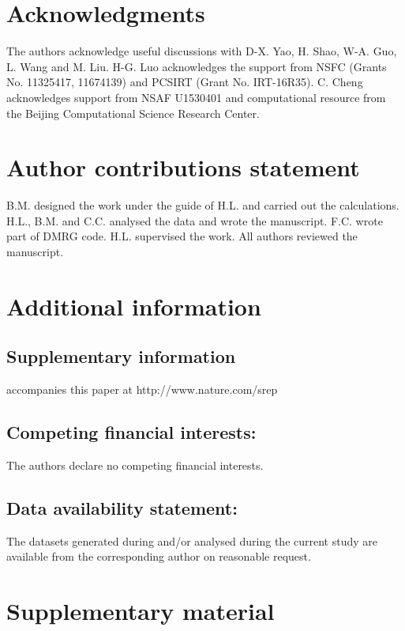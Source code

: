 \documentclass[article,10pt,onecolumn,superscriptaddress,floatfix]{revtex4}
\begin{document}
\section*{Acknowledgments}

The authors acknowledge useful discussions with D-X. Yao, H. Shao, W-A. Guo, L. Wang and M. Liu.
H-G. Luo acknowledges the support from NSFC (Grants No. 11325417, 11674139) and PCSIRT (Grant No. IRT-16R35).
C. Cheng acknowledges support from NSAF U1530401 and computational resource from the Beijing Computational Science Research Center.

\section*{Author contributions statement}

B.M. designed the work under the guide of H.L. and carried out the calculations. H.L., B.M. and C.C. analysed the data and wrote the manuscript. F.C. wrote part of DMRG code. H.L. supervised the work. All authors reviewed the manuscript.

\section*{Additional information}
\subsection*{Supplementary information}
accompanies this paper at http://www.nature.com/srep

\subsection*{Competing financial interests:} The authors declare no competing financial interests.
\subsection*{Data availability statement:}
The datasets generated during and/or analysed during the current study are available from the corresponding author on reasonable request.

\newpage
\section{Supplementary material}
\end{document}
